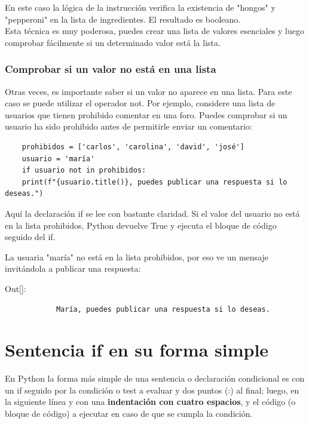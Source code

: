 En este caso la lógica de la instrucción verifica la existencia de {}"{}hongos{}"{} 
y {}"{}pepperoni{}"{} en la lista de ingredientes.  El resultado es booleano.\\ 


Esta técnica es muy poderosa,  puedes crear una lista de valores esenciales y luego comprobar fácilmente si un determinado valor está la lista.

\subsubsection{Comprobar si un valor no está en una lista}

Otras veces, es importante saber si un valor no aparece en una lista.  Para este caso se puede utilizar el operador {\ttfamily not}. Por ejemplo, considere una lista de usuarios que tienen prohibido comentar en una foro. Puedes comprobar si un usuario ha sido prohibido antes de permitirle enviar un comentario:

\hspace{-2.8cm}{\ttfamily \scriptsize prohibidos.py}\vspace{-0.5cm}
\begin{lstlisting} 
	prohibidos = ['carlos', 'carolina', 'david', 'josé']
	usuario = 'maría'
	if usuario not in prohibidos:
	print(f"{usuario.title()}, puedes publicar una respuesta si lo deseas.")
\end{lstlisting}	

Aquí la declaración {\ttfamily if}  se lee con bastante claridad. Si el valor del usuario no está en
la lista prohibidos, Python devuelve {\ttfamily True} y ejecuta el bloque de código seguido del {\ttfamily if}.

La usuaria {}"{}maría{}"{ } no está en la lista prohibidos, por eso ve un mensaje invitándola a publicar una respuesta:

{\ttfamily\scriptsize\scriptsize \noindent Out[]:\vspace{-0.3cm}	
	{\color{blue} 	
		\begin{verbatim}
			María, puedes publicar una respuesta si lo deseas.	
		\end{verbatim}
}}


\section{Sentencia {\ttfamily if} en su forma simple}


En Python la forma más simple de una sentencia o declaración condicional es con un {\ttfamily if} seguido por la condición o test a evaluar y dos puntos (:) al final; luego, en la siguiente línea y con una {\bf indentación con cuatro espacios}, y el código  (o bloque de código) a ejecutar en caso de que se cumpla la condición.

